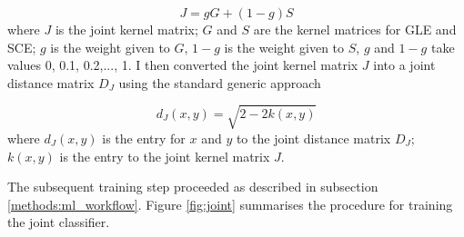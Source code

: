 \begin{equation}
    J = gG + (1-g)S
    \label{eq:joint}
\end{equation}
where $J$ is the joint kernel matrix; $G$ and $S$ are the kernel matrices for GLE and SCE; $g$ is the weight given to $G$, $1-g$ is the weight given to $S$, $g$ and $1-g$ take values 0, 0.1, 0.2,..., 1. I then converted the joint kernel matrix $J$ into a joint distance matrix $D_J$ using the standard generic approach \citep[more in the appendix equation \ref{eq:k2d_ori};][]{Phillips20112Distance}

\begin{equation}
    d_J(x,y) = \sqrt{2 - 2k(x,y)}
    \label{eq:k2d}
\end{equation}
where $d_J(x,y)$ is the entry for $x$ and $y$ to the joint distance matrix $D_J$; $k(x,y)$ is the entry to the joint kernel matrix $J$.

The subsequent training step proceeded as described in subsection \ref{methods:ml_workflow}. Figure \ref{fig:joint} summarises the procedure for training the joint classifier.




